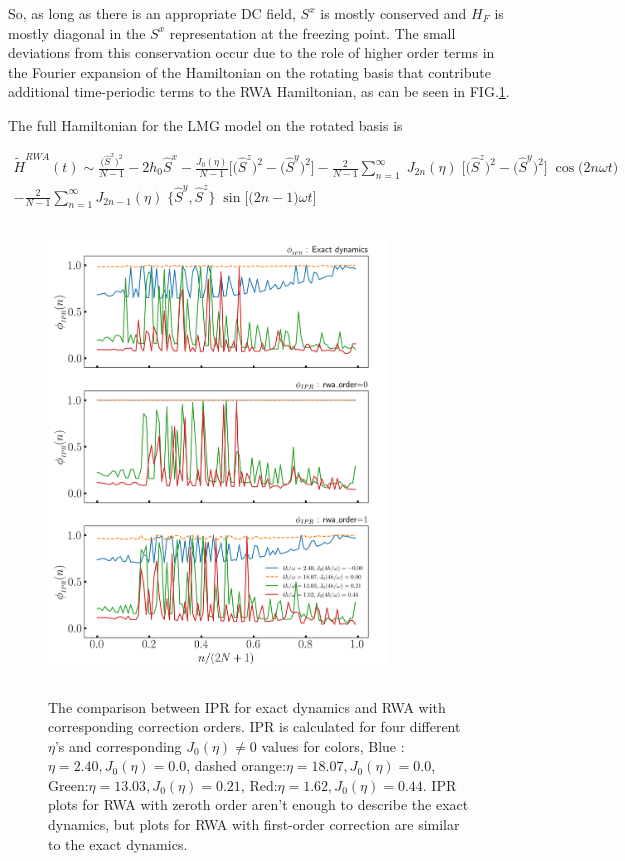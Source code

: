 \documentclass[%
reprint,
superscriptaddress,
amsmath,amssymb,
aps,
prb,
showkeys,
]{revtex4-2}
\begin{document}
	So, as long as there is an appropriate DC field, $S^x$ is mostly conserved and $H_F$ is mostly diagonal in the $S^x$ representation at the freezing point. The small deviations from this conservation occur due to the role of higher order terms in the Fourier expansion of the Hamiltonian on the rotating basis that contribute additional time-periodic terms to the RWA Hamiltonian, as can be seen in FIG.\ref{lmg_ipr_rwa11}.
	
	The full Hamiltonian for the LMG model on the rotated basis is
	\begin{widetext}
		\begin{multline}
			\tilde{H}^{RWA}(t)\sim \frac{\big(\hat{S}^x\big)^{2}}{N-1} - 2h_0 \hat{S}^x - \frac{J_0(\eta)}{N-1}\bigg[\big(\hat{S}^z\big)^{2} - \big(\hat{S}^y\big)^{2} \bigg] - \frac{2}{N-1}\sum^\infty_{n=1}\;J_{2n}(\eta)\;\Big[\big( \hat{S}^z\big)^2 - \big( \hat{S}^y\big)^2\Big]\;\cos{\big(2n\omega t\big)}\\
			- \frac{2}{N-1}\sum^\infty_{n=1}J_{2n-1}(\eta)\;\big\{ \hat{S}^y,  \hat{S}^z \big\}  \;\sin{\Big[\big(2n-1\big)\omega t\Big]}
		\end{multline}
	\end{widetext}
	
	\begin{figure}[ht!]
		\centering
		\includegraphics[height = 12.0cm, width =9.0cm]{comprasion_LMG_50_highFr90_exact_nd_rwa.jpeg}
		\label{lmg_ipr_rwa11}
		\caption{The comparison between IPR for exact dynamics and RWA with corresponding correction orders. IPR is calculated for four different $\eta$'s and corresponding $J_0(\eta)\neq 0$ values for colors, Blue :$\eta = 2.40, J_0(\eta) = 0.0$, dashed orange:$\eta = 18.07, J_0(\eta) = 0.0$, Green:$\eta =13.03, J_0(\eta) = 0.21$, Red:$\eta = 1.62, J_0(\eta)= 0.44$. IPR plots for RWA with zeroth order aren't enough to describe the exact dynamics, but plots for RWA with first-order correction are similar to the exact dynamics.}
	\end{figure}
	
\end{document}
